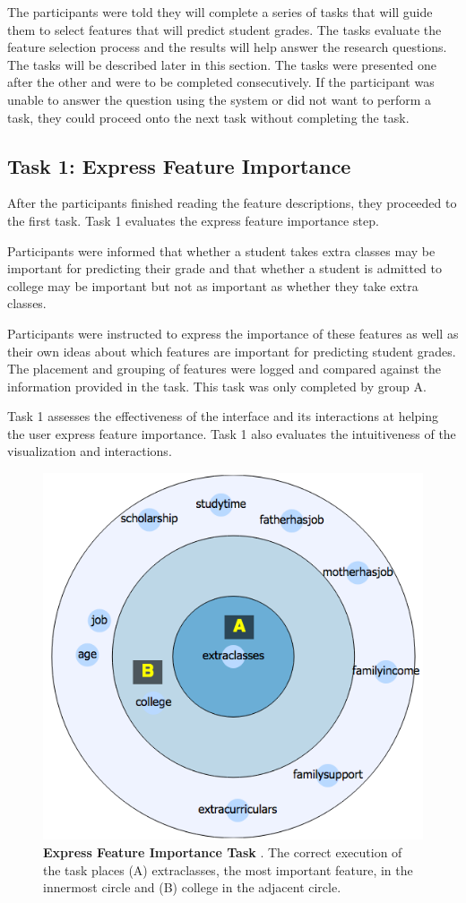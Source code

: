 The participants were told they will complete a series of tasks that will guide them to select features that will predict student grades. The tasks evaluate the feature selection process and the results will help answer the research questions. The tasks will be described later in this section. The tasks were presented one after the other and were to be completed consecutively. If the participant was unable to answer the question using the system or did not want to perform a task, they could proceed onto the next task without completing the task.

\subsection { Task 1: Express Feature Importance }
After the participants finished reading the feature descriptions, they proceeded to the first task. Task 1 evaluates the express feature importance step. 

Participants were informed that whether a student takes extra classes may be important for predicting their grade and that whether a student is admitted to college may be important but not as important as whether they take extra classes. 

Participants were instructed to express the importance of these features as well as their own ideas about which features are important for predicting student grades. The placement and grouping of features were logged and compared against the information provided in the task. This task was only completed by group A. 

Task 1 assesses the effectiveness of the interface and its interactions at helping the user express feature importance. Task 1 also evaluates the intuitiveness of the visualization and interactions. 

\begin{figure}
    \centering
    \includegraphics[width=.65\textwidth]{task1}
    \caption{\textbf{ Express Feature Importance Task }. The correct execution of the task places (A) extraclasses, the most important feature, in the innermost circle and (B) college in the adjacent circle. }
    \label{fig:Task1}
\end{figure}

